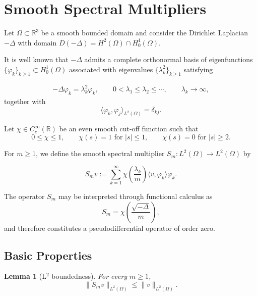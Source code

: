 \documentclass[11pt,letterpaper]{amsart}
\newtheorem{lemma}[theorem]{Lemma}
\begin{document}
\section{Smooth Spectral Multipliers}

Let $\Omega \subset \mathbb{R}^3$ be a smooth bounded domain and
consider the Dirichlet Laplacian $-\Delta$ with domain
$D(-\Delta)=H^2(\Omega)\cap H_0^1(\Omega)$.

It is well known that $-\Delta$ admits a complete orthonormal basis
of eigenfunctions $\{\varphi_k\}_{k\ge1} \subset H_0^1(\Omega)$
associated with eigenvalues $\{\lambda_k^2\}_{k\ge1}$ satisfying

\begin{eqnarray*}
-\Delta \varphi_k = \lambda_k^2 \varphi_k,
\qquad
0 < \lambda_1 \le \lambda_2 \le \cdots,
\qquad
\lambda_k \to \infty,
\end{eqnarray*}
together with
\begin{equation*}
\langle \varphi_k, \varphi_j \rangle_{L^2(\Omega)} = \delta_{kj}.
\end{equation*}

Let $\chi \in C_c^\infty(\mathbb{R})$ be an even smooth cut-off
function such that
\[
0 \le \chi \le 1,
\qquad
\chi(s)=1 \text{ for } |s|\le1,
\qquad
\chi(s)=0 \text{ for } |s|\ge2.
\]

For $m \ge 1$, we define the smooth spectral multiplier
$S_m : L^2(\Omega) \to L^2(\Omega)$ by

\begin{equation}\label{Sm-def}
S_m v
:=
\sum_{k=1}^{\infty}
\chi\!\left(\frac{\lambda_k}{m}\right)
\langle v, \varphi_k \rangle
\varphi_k.
\end{equation}

The operator $S_m$ may be interpreted through functional calculus as
\[
S_m = \chi\!\left(\frac{\sqrt{-\Delta}}{m}\right),
\]
and therefore constitutes a pseudodifferential operator of order zero.

\subsection*{Basic Properties}

\begin{lemma}[L$^2$ boundedness]
For every $m \ge 1$,
\[
\|S_m v\|_{L^2(\Omega)} \le \|v\|_{L^2(\Omega)}.
\]
\end{lemma}
\end{document}
